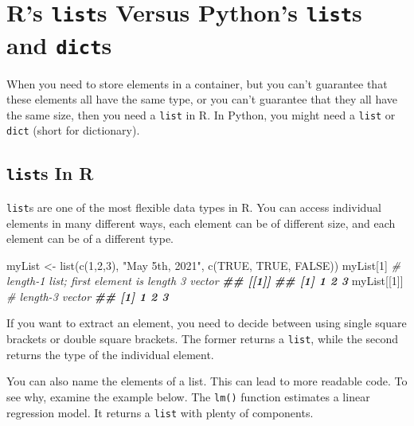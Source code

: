 \documentclass[
  12pt,
  krantz2]{krantz}
\makeatletter
\newenvironment{Shaded}{\begin{snugshade}}{\end{snugshade}}
\newcommand{\CommentTok}[1]{\textcolor[rgb]{0.37,0.37,0.37}{\textit{#1}}}
\newcommand{\ConstantTok}[1]{\textcolor[rgb]{0,0,0}{#1}}
\newcommand{\DecValTok}[1]{\textcolor[rgb]{0.06,0.06,0.06}{#1}}
\newcommand{\DocumentationTok}[1]{\textcolor[rgb]{0.37,0.37,0.37}{\textbf{\textit{#1}}}}
\newcommand{\FunctionTok}[1]{\textcolor[rgb]{0,0,0}{#1}}
\newcommand{\NormalTok}[1]{#1}
\newcommand{\OtherTok}[1]{\textcolor[rgb]{0.37,0.37,0.37}{#1}}
\newcommand{\StringTok}[1]{\textcolor[rgb]{0.5,0.5,0.5}{#1}}
\newenvironment{kframe}{%
\medskip{}
\setlength{\fboxsep}{.8em}
 \def\at@end@of@kframe{}%
 \ifinner\ifhmode%
  \def\at@end@of@kframe{\end{minipage}}%
  \begin{minipage}{\columnwidth}%
 \fi\fi%
 \def\FrameCommand##1{\hskip\@totalleftmargin \hskip-\fboxsep
 \colorbox{shadecolor}{##1}\hskip-\fboxsep
     \hskip-\linewidth \hskip-\@totalleftmargin \hskip\columnwidth}%
 \MakeFramed {\advance\hsize-\width
   \@totalleftmargin\z@ \linewidth\hsize
   \@setminipage}}%
 {\par\unskip\endMakeFramed%
 \at@end@of@kframe}
\renewenvironment{Shaded}{\begin{kframe}}{\end{kframe}}
\makeatother
\begin{document}
\hypertarget{rs-lists-versus-pythons-lists-and-dicts}{%
\chapter{\texorpdfstring{R's \texttt{list}s Versus Python's \texttt{list}s and \texttt{dict}s}{R's lists Versus Python's lists and dicts}}\label{rs-lists-versus-pythons-lists-and-dicts}}

When you need to store elements in a container, but you can't guarantee that these elements all have the same type, or you can't guarantee that they all have the same size, then you need a \texttt{list} in R. In Python, you might need a \texttt{list} or \texttt{dict} (short for dictionary).

\hypertarget{lists-in-r}{%
\section{\texorpdfstring{\texttt{list}s In R}{lists In R}}\label{lists-in-r}}

\texttt{list}s are one of the most flexible data types in R. You can access individual elements in many different ways, each element can be of different size, and each element can be of a different type.

\begin{Shaded}
\begin{Highlighting}[]
\NormalTok{myList }\OtherTok{\textless{}{-}} \FunctionTok{list}\NormalTok{(}\FunctionTok{c}\NormalTok{(}\DecValTok{1}\NormalTok{,}\DecValTok{2}\NormalTok{,}\DecValTok{3}\NormalTok{), }\StringTok{"May 5th, 2021"}\NormalTok{, }\FunctionTok{c}\NormalTok{(}\ConstantTok{TRUE}\NormalTok{, }\ConstantTok{TRUE}\NormalTok{, }\ConstantTok{FALSE}\NormalTok{))}
\NormalTok{myList[}\DecValTok{1}\NormalTok{] }\CommentTok{\# length{-}1 list; first element is length 3 vector}
\DocumentationTok{\#\# [[1]]}
\DocumentationTok{\#\# [1] 1 2 3}
\NormalTok{myList[[}\DecValTok{1}\NormalTok{]] }\CommentTok{\# length{-}3 vector}
\DocumentationTok{\#\# [1] 1 2 3}
\end{Highlighting}
\end{Shaded}

If you want to extract an element, you need to decide between using single square brackets or double square brackets. The former returns a \texttt{list}, while the second returns the type of the individual element.

You can also name the elements of a list. This can lead to more readable code. To see why, examine the example below. The \texttt{lm()} function estimates a linear regression model. It returns a \texttt{list} with plenty of components.
\end{document}

